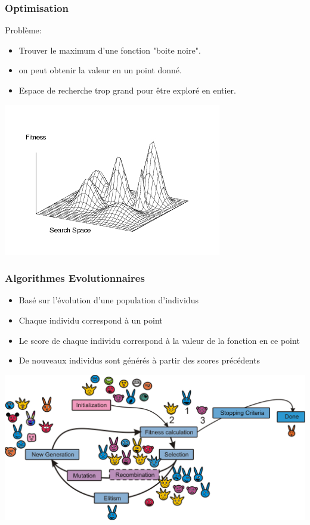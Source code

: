 \documentclass{beamer}
\begin{document}
\begin{frame}
    \frametitle{Optimisation}
    Problème: 
    \begin{itemize}
    \item Trouver le maximum d'une fonction "boite noire".
    \item on peut obtenir la valeur en un point donné.
    \item Espace de recherche trop grand pour être exploré en entier.
    \end{itemize}

    \begin{center}
        \includegraphics[scale=0.5]{multimodalFitnessLandscape.jpg}
    \end{center}

\end{frame}

\begin{frame}
    \frametitle{Algorithmes Evolutionnaires}

    \begin{itemize}
        \item Basé sur l'évolution d'une population d'individus
        \item Chaque individu correspond à un point 
        \item Le score de chaque individu correspond à la valeur de la fonction en ce point
        \item De nouveaux individus sont générés à partir des scores précédents
    \end{itemize}
    \begin{center}
        \includegraphics[scale=0.3]{EAalgorithmPedagogical.png}
    \end{center}


\end{frame}
\end{document}
